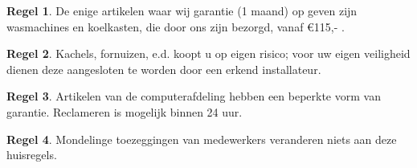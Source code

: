 \documentclass[12pt,a4paper]{article}
\theoremstyle{definition}
\newtheorem{regel}{Regel}
\begin{document}
\begin{regel}
De enige artikelen waar wij garantie (1 maand) op geven zijn wasmachines en koelkasten,  die door ons zijn bezorgd, vanaf \euro 115,- . 
\end{regel}
\begin{regel}
Kachels, fornuizen, e.d. koopt u op eigen risico; voor uw eigen veiligheid dienen deze aangesloten te worden door een erkend installateur.
\end{regel}
\begin{regel}

Artikelen van de computerafdeling hebben een beperkte vorm van garantie. Reclameren is mogelijk binnen 24 uur.
\end{regel}
\begin{regel}
Mondelinge toezeggingen van medewerkers veranderen niets aan deze huisregels.
\end{regel}
\end{document}
